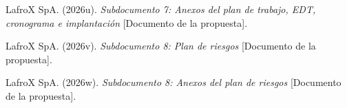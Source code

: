 \begin{list}{}{\setlength{\leftmargin}{1.27cm}\setlength{\itemindent}{-1.27cm}\setlength{\itemsep}{0.4em}\setlength{\parsep}{0pt}}
  \item \begin{samepage}LafroX SpA. (2026u). \emph{Subdocumento 7: Anexos del plan de trabajo, EDT, cronograma e implantación} [Documento de la propuesta].\par\end{samepage}
  \item \begin{samepage}LafroX SpA. (2026v). \emph{Subdocumento 8: Plan de riesgos} [Documento de la propuesta].\par\end{samepage}
  \item \begin{samepage}LafroX SpA. (2026w). \emph{Subdocumento 8: Anexos del plan de riesgos} [Documento de la propuesta].\par\end{samepage}
\end{list}
